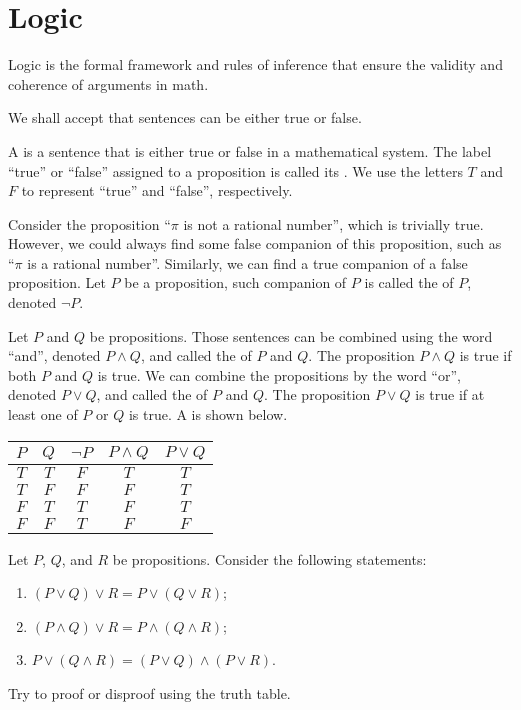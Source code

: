 \documentclass[10pt]{article}
\begin{document}
\section{Logic}
Logic is the formal framework and rules of inference that ensure the validity and coherence of arguments in math. 
\begin{remark}
    We shall accept that sentences can be either true or false.
\end{remark} 
A  is a sentence that is either true or false in a mathematical system. The label ``true'' or ``false'' assigned to a proposition is called its . We use the letters $T$ and $F$ to represent ``true'' and ``false'', respectively.
\par
Consider the proposition ``$\pi$ is not a rational number'', which is trivially true. However, we could always find some false companion of this proposition, such as ``$\pi$ is a rational number''. Similarly, we can find a true companion of a false proposition. Let $P$ be a proposition, such companion of $P$ is called the  of $P$, denoted $\neg P$.
\par
Let $P$ and $Q$ be propositions. Those sentences can be combined using the word ``and'', denoted $P\wedge Q$, and called the  of $P$ and $Q$. The proposition $P\wedge Q$ is true if both $P$ and $Q$ is true. We can combine the propositions by the word ``or'', denoted $P\vee Q$, and called the  of $P$ and $Q$. The proposition $P\vee Q$ is true if at least one of $P$ or $Q$ is true. A  is shown below.
\begin{center}
    \begin{tabular}{cc|ccc}
        $P$ & $Q$ & $\neg P$ & $P\wedge Q$ & $P\vee Q$ \\
        \hline
        $T$ & $T$ & $F$ & $T$ & $T$ \\
        $T$ & $F$ & $F$ & $F$ & $T$ \\
        $F$ & $T$ & $T$ & $F$ & $T$ \\
        $F$ & $F$ & $T$ & $F$ & $F$ \\
    \end{tabular}
\end{center}
\begin{example}
    Let $P$, $Q$, and $R$ be propositions. Consider the following statements:
    \begin{enumerate}
        \item $(P\vee Q)\vee R=P\vee(Q\vee R)$;
        \item $(P\wedge Q)\vee R=P\wedge(Q\wedge R)$;
        \item $P\vee(Q\wedge R)=(P\vee Q)\wedge(P\vee R)$.
    \end{enumerate}
    Try to proof or disproof using the truth table.
\end{example}
\end{document}
